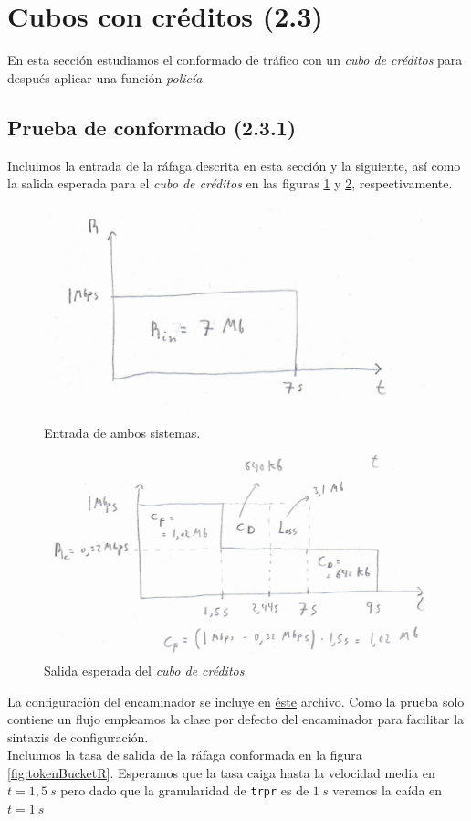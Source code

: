 \documentclass[11pt]{article}
\begin{document}
    \section{Cubos con créditos (2.3)}
        En esta sección estudiamos el conformado de tráfico con un \textit{cubo de créditos} para después aplicar una función \textit{policía}.

        \subsection{Prueba de conformado (2.3.1)}
            Incluimos la entrada de la ráfaga descrita en esta sección y la siguiente, así como la salida esperada para el \textit{cubo de créditos} en las figuras \ref{fig:inputBucks} y \ref{fig:outputBucks}, respectivamente.\\

            \begin{figure}
                \centering
                \includegraphics[width=0.6\linewidth]{tokenBucketsInput.png}
                \caption{Entrada de ambos sistemas.}
                \label{fig:inputBucks}
            \end{figure}

            \begin{figure}
                \centering
                \includegraphics[width=0.6\linewidth]{tokenBucketsOutput.png}
                \caption{Salida esperada del \textit{cubo de créditos}.}
                \label{fig:outputBucks}
            \end{figure}

            La configuración del encaminador se incluye en \href{https://github.com/UAH-s-Telematics-Engineering-Tasks/traff_eng/blob/master/P2/Router_confs/tokenBucket.cfg}{éste} archivo. Como la prueba solo contiene un flujo empleamos la clase por defecto del encaminador para facilitar la sintaxis de configuración.\\

            Incluimos la tasa de salida de la ráfaga conformada en la figura \ref{fig:tokenBucketR}. Esperamos que la tasa caiga hasta la velocidad media en $t = 1,5\ s$ pero dado que la granularidad de \texttt{trpr} es de $1\ s$ veremos la caída en $t = 1\ s$
\end{document}
